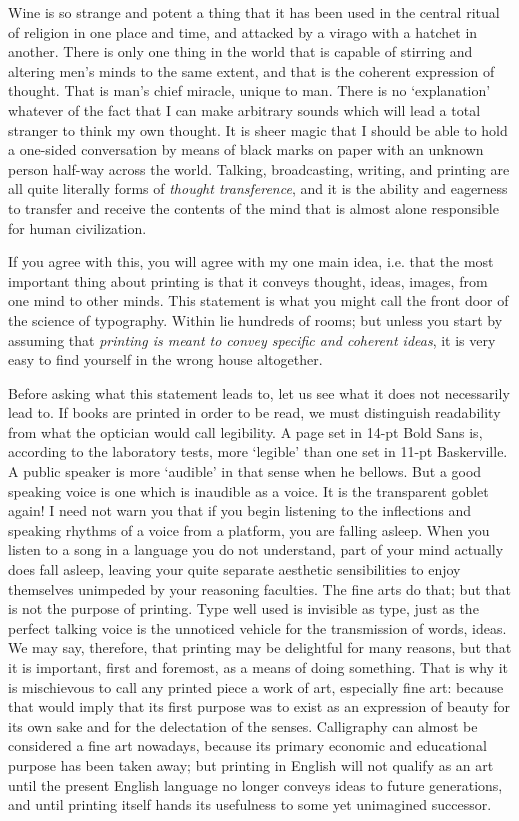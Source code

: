 \documentclass[12pt]{article}
\begin{document}
Wine is so strange and potent a thing that it has been used in the central ritual of religion in one place and time, and attacked by a virago with a hatchet in another. There is only one thing in the world that is capable of stirring and altering men's minds to the same extent, and that is the coherent expression of thought. That is man's chief miracle, unique to man. There is no `explanation' whatever of the fact that I can make arbitrary sounds which will lead a total stranger to think my own thought. It is sheer magic that I should be able to hold a one-sided conversation by means of black marks on paper with an unknown
person half-way across the world. Talking, broadcasting, writing, and printing are all quite literally forms of \emph{thought transference}, and it is the ability and eagerness to transfer and receive the contents of the mind that is almost alone responsible for human civilization.

If you agree with this, you will agree with my one main idea, i.e. that the most important thing about printing is that it conveys thought, ideas, images, from one mind to other minds. This statement is what you might call the front door of the science of typography. Within lie hundreds of rooms; but unless you start by assuming that \emph{printing is meant to convey specific and coherent ideas}, it is very easy to find yourself in the wrong house altogether.

Before asking what this statement leads to, let us see what it does not necessarily lead to. If books are printed in order to be read, we must distinguish readability from what the optician would call legibility. A page set in 14-pt Bold Sans is, according to the laboratory tests, more `legible' than one set in 11-pt Baskerville. A public speaker is more `audible' in that sense when he bellows. But a good speaking voice is one which is inaudible as a voice. It is the transparent goblet again! I need not warn you that if you begin listening to the inflections and speaking rhythms of a voice from a platform, you are falling asleep. When you listen to a song in a language you do not understand, part of your mind actually does fall asleep, leaving your quite separate aesthetic sensibilities to enjoy themselves unimpeded by your reasoning faculties. The fine arts do that; but that is not the purpose of printing. Type well used is invisible as type, just as the perfect talking voice is the unnoticed vehicle for the transmission of words, ideas.
We may say, therefore, that printing may be delightful for many reasons, but that it is important, first and foremost, as a means of doing something. That is why it is mischievous to call any printed piece a work of art, especially fine art: because that would imply that its first purpose was to exist as an expression of beauty for its own sake and for the delectation of the senses. Calligraphy can almost be considered a fine art nowadays, because its primary economic and educational purpose has been taken away; but printing in English will not qualify as an art until the present English language no longer conveys ideas to future generations, and until printing itself hands its usefulness to some yet unimagined successor.
\end{document}
